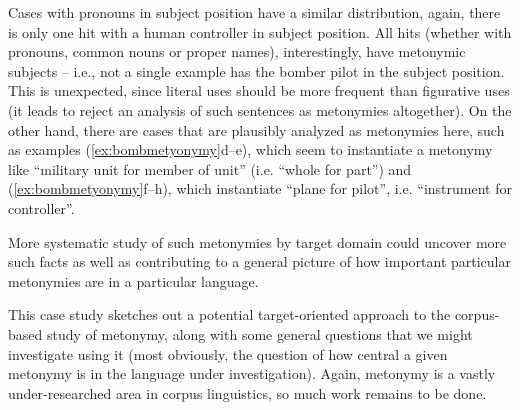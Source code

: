 Cases with pronouns in subject position have a similar distribution, again, there is only one hit with a human controller in subject position. All hits (whether with pronouns, common nouns or proper names), interestingly, have metonymic subjects -- i.e., not a single example has the bomber pilot in the subject position. This is unexpected, since literal uses should be more frequent than figurative uses (it leads \citet{stefanowitsch_metonymies_2015} to reject an analysis of such sentences as metonymies altogether). On the other hand, there are cases that are plausibly analyzed as metonymies here, such as examples (\ref{ex:bombmetyonymy}d--e), which seem to instantiate a metonymy like ``military unit for member of unit'' (i.e. ``whole for part'') and (\ref{ex:bombmetyonymy}f--h), which instantiate ``plane for pilot'', i.e. ``instrument for controller''.

More systematic study of such metonymies by target domain could uncover more such facts as well as contributing to a general picture of how important particular metonymies are in a particular language.

This case study sketches out a potential target-oriented approach to the corpus-based study of metonymy, along with some general questions that we might investigate using it (most obviously, the question of how central a given metonymy is in the language under investigation). Again, metonymy is a vastly under\hyp{}researched area in corpus linguistics, so much work remains to be done.

